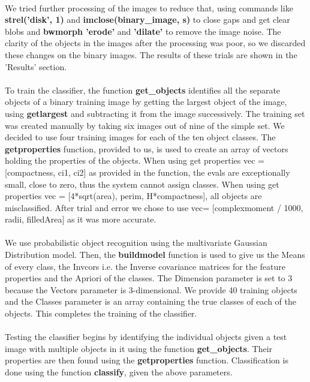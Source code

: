\documentclass[11pt]{article}
\begin{document}
\paragraph{}
We tried further processing of the images to reduce that, using commands like \textbf{strel('disk', 1)} and \textbf{imclose(binary\_image, s)} to close gaps and get clear blobs and \textbf{bwmorph 'erode'} and \textbf{'dilate'} to remove the image noise. The clarity of the objects in the images after the processing was poor, so we discarded these changes on the binary images. The results of these trials are shown in the 'Results' section. 
\paragraph{}
To train the classifier, the function \textbf{get\_objects} identifies all the separate objects of a binary training image by getting the largest object of the image, using \textbf{getlargest} and subtracting it from the image successively. The training set was created manually by taking six images out of nine of the simple set. We decided to use four training images for each of the ten object classes. The \textbf{getproperties }function, provided to us, is used to create an array of vectors holding the properties of the objects. When using get properties vec = [compactness, ci1, ci2] as provided in the function, the evals are exceptionally small, close to zero, thus the system cannot assign classes. When using get properties vec = [4*sqrt(area), perim, H*compactness], all objects are misclassified. After trial and error we chose to use vec= [complexmoment / 1000, radii, filledArea] as it was more accurate.
\paragraph{}
We use probabilistic object recognition using the multivariate Gaussian Distribution model.
Then, the \textbf{buildmodel} function is used to give us the Means of every class, the Invcors i.e. the Inverse covariance matrices for the feature properties and the Apriori of the classes. The Dimension parameter is set to 3 because the Vectors parameter is 3-dimensional. We provide 40 training objects and the Classes parameter is an array containing the true classes of each of the objects. This completes the training of the classifier. 
\paragraph{}
Testing the classifier begins by identifying the individual objects given a test image with multiple objects in it using the function \textbf{get\_objects}. Their properties are then found using the \textbf{getproperties} function. Classification is done using the function \textbf{classify}, given the above parameters. 
\end{document}
